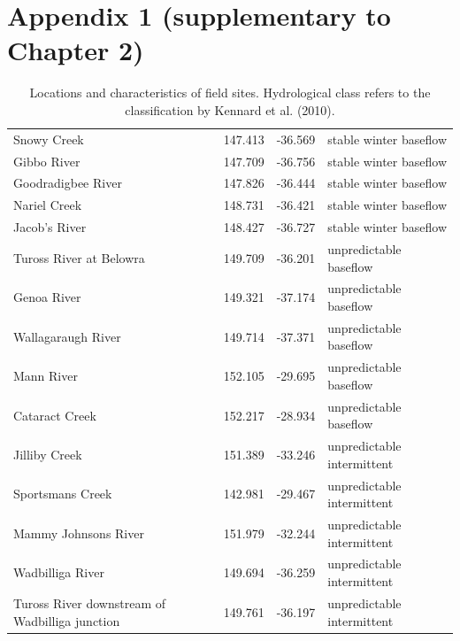 \chapter[Appendix 1 (supplementary to Chapter 2)]{Appendix 1 (supplementary to Chapter 2)}

\begin{table}[ht]
\tiny
\centering
\caption[Locations and characteristics of field sites.]{\small{Locations and characteristics of field sites. Hydrological class refers to the classification by Kennard et al. (2010).}}
\label{tab:Ch2sup_T1}
{\tabulinesep=1.2mm
\begin{tabu}to 
\hline
{} &  &  &  \\
\hline
Snowy Creek & 147.413 & -36.569 & stable winter baseflow \\
Gibbo River & 147.709 & -36.756 & stable winter baseflow \\
Goodradigbee River & 147.826 & -36.444 & stable winter baseflow \\
Nariel Creek & 148.731 & -36.421 & stable winter baseflow \\
Jacob’s River & 148.427 & -36.727 & stable winter baseflow \\
Tuross River at Belowra & 149.709 & -36.201 & unpredictable baseflow \\
Genoa River & 149.321 & -37.174 & unpredictable baseflow \\
Wallagaraugh River & 149.714 & -37.371 & unpredictable baseflow \\
Mann River & 152.105 & -29.695 & unpredictable baseflow \\
Cataract Creek & 152.217 & -28.934 & unpredictable baseflow \\
Jilliby Creek & 151.389 & -33.246 & unpredictable intermittent \\
Sportsmans Creek & 142.981 & -29.467 & unpredictable intermittent \\
Mammy Johnsons River & 151.979 & -32.244 & unpredictable intermittent \\
Wadbilliga River & 149.694 & -36.259 & unpredictable intermittent \\
Tuross River downstream of Wadbilliga junction & 149.761 & -36.197 & unpredictable intermittent \\ \hline
\end{tabu}}
\end{table}
\clearpage


